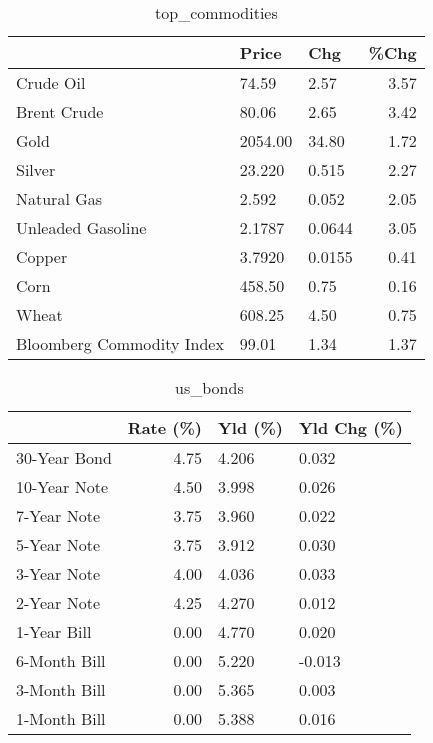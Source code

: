 \documentclass{article}%
\begin{document}
\begin{table}[htbp]%
\caption{top\_commodities}%
\centering%
\begin{adjustbox}{width=1\textwidth}%
\begin{tabular}{lllr}
\toprule
                          &   Price &    Chg &  \%Chg \\
\midrule
               Crude Oil  &   74.59 &   2.57 &  3.57 \\
             Brent Crude  &   80.06 &   2.65 &  3.42 \\
                    Gold  & 2054.00 &  34.80 &  1.72 \\
                  Silver  &  23.220 &  0.515 &  2.27 \\
             Natural Gas  &   2.592 &  0.052 &  2.05 \\
       Unleaded Gasoline  &  2.1787 & 0.0644 &  3.05 \\
                  Copper  &  3.7920 & 0.0155 &  0.41 \\
                    Corn  &  458.50 &   0.75 &  0.16 \\
                   Wheat  &  608.25 &   4.50 &  0.75 \\
Bloomberg Commodity Index &   99.01 &   1.34 &  1.37 \\
\bottomrule
\end{tabular}
%
\end{adjustbox}%
\end{table}

%


\begin{table}[htbp]%
\caption{us\_bonds}%
\centering%
\begin{adjustbox}{width=1\textwidth}%
\begin{tabular}{lrll}
\toprule
             &  Rate (\%) & Yld (\%) & Yld Chg (\%) \\
\midrule
30-Year Bond &      4.75 &   4.206 &       0.032 \\
10-Year Note &      4.50 &   3.998 &       0.026 \\
 7-Year Note &      3.75 &   3.960 &       0.022 \\
 5-Year Note &      3.75 &   3.912 &       0.030 \\
 3-Year Note &      4.00 &   4.036 &       0.033 \\
 2-Year Note &      4.25 &   4.270 &       0.012 \\
 1-Year Bill &      0.00 &   4.770 &       0.020 \\
6-Month Bill &      0.00 &   5.220 &      -0.013 \\
3-Month Bill &      0.00 &   5.365 &       0.003 \\
1-Month Bill &      0.00 &   5.388 &       0.016 \\
\bottomrule
\end{tabular}
%
\end{adjustbox}%
\end{table}
\end{document}
